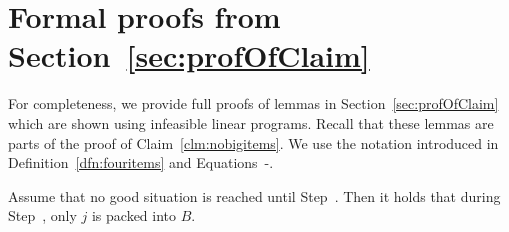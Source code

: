 \section{Formal proofs from Section~\ref{sec:profOfClaim}}\label{app:proofOfClaim}

For completeness, we provide full proofs of lemmas in Section~\ref{sec:profOfClaim}
which are shown using infeasible linear programs. Recall that these lemmas are parts of the
proof of Claim~\ref{clm:nobigitems}.
We use the notation introduced in Definition~\ref{dfn:fouritems} and Equations~-.

\begin{lem}
Assume that no good situation is reached until Step~{\rm {}}. Then
it holds that during Step~{\rm {}}, only $j$ is packed into $B$.
\end{lem}

